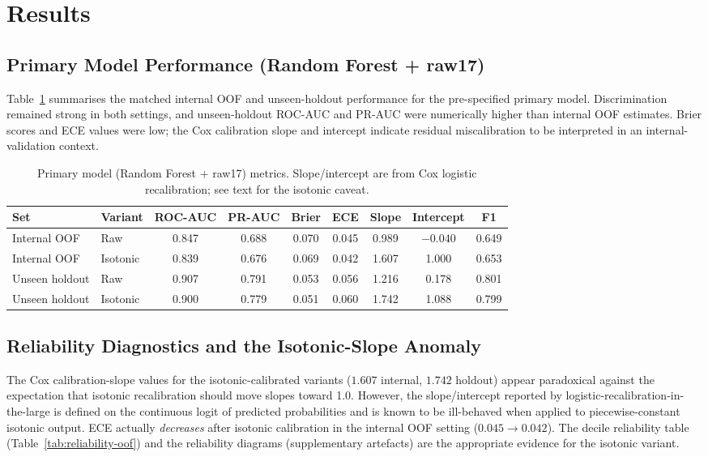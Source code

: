 \documentclass[11pt,a4paper]{article}
\begin{document}
\section{Results}

\subsection{Primary Model Performance (Random Forest + raw17)}
Table~\ref{tab:primary-metrics} summarises the matched internal OOF and unseen-holdout performance
for the pre-specified primary model. Discrimination remained strong in both settings, and
unseen-holdout ROC-AUC and PR-AUC were numerically higher than internal OOF estimates. Brier scores
and ECE values were low; the Cox calibration slope and intercept indicate residual miscalibration to
be interpreted in an internal-validation context.

\begin{table}[h!]
\centering
\small
\caption{Primary model (Random Forest + raw17) metrics. Slope/intercept are from Cox logistic
recalibration; see text for the isotonic caveat.}
\label{tab:primary-metrics}
\begin{tabular}{llccccccc}
\toprule
Set & Variant & ROC-AUC & PR-AUC & Brier & ECE & Slope & Intercept & F1 \\
\midrule
Internal OOF & Raw & 0.847 & 0.688 & 0.070 & 0.045 & 0.989 & $-0.040$ & 0.649 \\
Internal OOF & Isotonic & 0.839 & 0.676 & 0.069 & 0.042 & 1.607 & 1.000 & 0.653 \\
Unseen holdout & Raw & 0.907 & 0.791 & 0.053 & 0.056 & 1.216 & 0.178 & 0.801 \\
Unseen holdout & Isotonic & 0.900 & 0.779 & 0.051 & 0.060 & 1.742 & 1.088 & 0.799 \\
\bottomrule
\end{tabular}
\end{table}

\subsection{Reliability Diagnostics and the Isotonic-Slope Anomaly}
The Cox calibration-slope values for the isotonic-calibrated variants ($1.607$ internal, $1.742$
holdout) appear paradoxical against the expectation that isotonic recalibration should move slopes
toward 1.0. However, the slope/intercept reported by logistic-recalibration-in-the-large is defined
on the continuous logit of predicted probabilities and is known to be ill-behaved when applied to
piecewise-constant isotonic output\cite{NiculescuMizil2005,VanCalster2019}. ECE actually
\emph{decreases} after isotonic calibration in the internal OOF setting ($0.045 \rightarrow 0.042$).
The decile reliability table (Table~\ref{tab:reliability-oof}) and the reliability diagrams
(supplementary artefacts) are the appropriate evidence for the isotonic variant.
\end{document}
